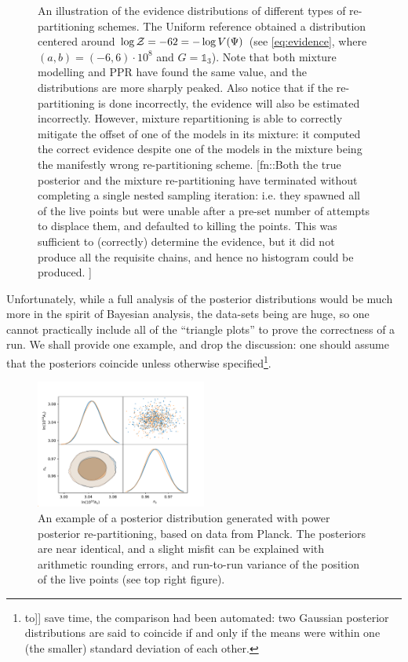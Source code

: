\documentclass[usenatbib]{mnras}
\begin{document}
\begin{figure}

\caption{\label{org225edd2}
An illustration of the evidence distributions of different types of re-partitioning schemes. The Uniform reference obtained a distribution centered around \(\log {\cal Z} = -62 = - \log V(\Psi)\) (see \autoref{eq:evidence}, where \((a,b)=(-6, 6)\cdot 10^{8}\) and \(G=\mathds{1}_{3}\)). Note that both mixture modelling and PPR have found the same value, and the distributions are more sharply peaked. Also notice that if the re-partitioning is done incorrectly, the evidence will also be estimated incorrectly. However, mixture repartitioning is able to correctly mitigate the offset of one of the models in its mixture: it computed the correct evidence despite one of the models in the mixture being the manifestly wrong re-partitioning scheme. [fn::Both the true posterior and the mixture re-partitioning have terminated without completing a single nested sampling iteration: i.e. they spawned all of the live points but were unable after a pre-set number of attempts to displace them, and defaulted to killing the points. This was sufficient to (correctly) determine the evidence, but it did not produce all the requisite chains, and hence no histogram could be produced. ]}
\end{figure}

Unfortunately, while a full analysis of the posterior distributions
would be much more in the spirit of Bayesian analysis, the data-sets
being are huge, so one cannot practically include all of
the ``triangle plots'' to prove the correctness of a run. We shall
provide one example, and drop the discussion: one should assume
that the posteriors coincide unless otherwise specified\footnote{to]] save time, the comparison had been automated: two Gaussian
posterior distributions are said to coincide if and only if the means
were within one (the smaller) standard deviation  of each
other.}. 

\begin{figure}
 \includegraphics[width=0.5\textwidth]{./illustrations/misfit.pdf}
\caption{\label{org4494531}
An example of a posterior distribution generated with power posterior re-partitioning, based on data from Planck. The posteriors are near identical, and a slight misfit can be explained with arithmetic rounding errors, and run-to-run variance of the position of the live points (see top right figure).}
\end{figure}
\end{document}
